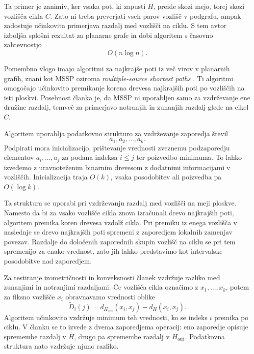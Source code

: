 \documentclass[sigconf
]{acmart}
\theoremstyle{definition}
\begin{document}
Ta primer je zanimiv, ker vsaka pot, ki zapusti $H$, preide skozi mejo, torej skozi vozlišča cikla $C$. Zato ni treba preverjati vseh parov vozlišč v podgrafu, ampak zadostuje učinkovita primerjava razdalj med vozlišči na ciklu. S tem avtor izboljša splošni rezultat za planarne grafe in dobi algoritem s časovno zahtevnostjo
\begin{equation}
    O(n \log n).
\end{equation}

Pomembno vlogo imajo algoritmi za najkrajše poti iz več virov v planarnih grafih, znani kot MSSP oziroma \textit{multiple-source shortest paths} \cite{mssp_emb, mssp_plan}. Ti algoritmi omogočajo učinkovito premikanje korena drevesa najkrajših poti po vozliščih na isti ploskvi. Posebnost članka je, da MSSP ni uporabljen samo za vzdrževanje ene družine razdalj, temveč za primerjavo notranjih in zunanjih razdalj glede na cikel $C$.

Algoritem uporablja podatkovno strukturo za vzdrževanje zaporedja števil
\begin{equation}
    a_1, a_2, \ldots, a_k.
\end{equation}
Podpirati mora inicializacijo, prištevanje vrednosti zveznemu podzaporedju elementov $a_i,\ldots,a_j$ za podana indeksa $i \leq j$ ter poizvedbo minimuma. To lahko izvedemo z uravnoteženim binarnim drevesom z dodatnimi informacijami v vozliščih. Inicializacija traja $O(k)$, vsaka posodobitev ali poizvedba pa $O(\log k)$.

Ta struktura se uporabi pri vzdrževanju razdalj med vozlišči na meji ploskve. Namesto da bi za vsako vozlišče cikla znova izračunali drevo najkrajših poti, algoritem premika koren drevesa vzdolž cikla. Pri premiku iz enega vozlišča v naslednje se drevo najkrajših poti spremeni z zaporedjem lokalnih zamenjav povezav. Razdalje do določenih zaporednih skupin vozlišč na ciklu se pri tem spremenijo za enako vrednost, zato jih lahko predstavimo kot intervalske posodobitve nad zaporedjem.

Za testiranje izometričnosti in konveksnosti članek vzdržuje razliko med zunanjimi in notranjimi razdaljami. Če vozlišča cikla označimo z $x_1,\ldots,x_k$, potem za fiksno vozlišče $x_i$ obravnavamo vrednosti oblike
\begin{equation}
    \tilde{D}_i(j) =
    d_{H_{\mathrm{out}}}(x_i,x_j) - d_H(x_i,x_j).
\end{equation}
Algoritem učinkovito vzdržuje minimum teh vrednosti, ko se indeks $i$ premika po ciklu. V članku se to izvede z dvema zaporedjema operacij: eno zaporedje opisuje spremembe razdalj v $H$, drugo pa spremembe razdalj v $H_{\mathrm{out}}$. Podatkovna struktura nato vzdržuje njuno razliko.
\end{document}
